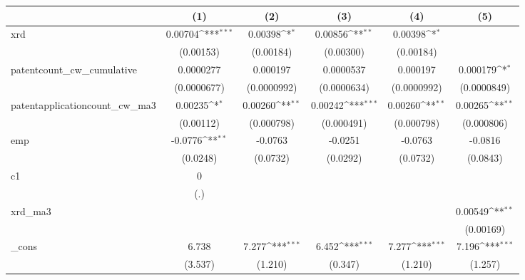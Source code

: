 {
\def\sym#1{\ifmmode^{#1}\else\(^{#1}\)\fi}
\begin{tabular}{l*{5}{c}}
\hline\hline
            &\multicolumn{1}{c}{(1)}         &\multicolumn{1}{c}{(2)}         &\multicolumn{1}{c}{(3)}         &\multicolumn{1}{c}{(4)}         &\multicolumn{1}{c}{(5)}         \\
\hline
xrd         &     0.00704\sym{***}&     0.00398\sym{*}  &     0.00856\sym{**} &     0.00398\sym{*}  &                     \\
            &   (0.00153)         &   (0.00184)         &   (0.00300)         &   (0.00184)         &                     \\
[1em]
patentcount\_cw\_cumulative&   0.0000277         &    0.000197         &   0.0000537         &    0.000197         &    0.000179\sym{*}  \\
            & (0.0000677)         & (0.0000992)         & (0.0000634)         & (0.0000992)         & (0.0000849)         \\
[1em]
patentapplicationcount\_cw\_ma3&     0.00235\sym{*}  &     0.00260\sym{**} &     0.00242\sym{***}&     0.00260\sym{**} &     0.00265\sym{**} \\
            &   (0.00112)         &  (0.000798)         &  (0.000491)         &  (0.000798)         &  (0.000806)         \\
[1em]
emp         &     -0.0776\sym{**} &     -0.0763         &     -0.0251         &     -0.0763         &     -0.0816         \\
            &    (0.0248)         &    (0.0732)         &    (0.0292)         &    (0.0732)         &    (0.0843)         \\
[1em]
c1          &           0         &                     &                     &                     &                     \\
            &         (.)         &                     &                     &                     &                     \\
[1em]
xrd\_ma3     &                     &                     &                     &                     &     0.00549\sym{**} \\
            &                     &                     &                     &                     &   (0.00169)         \\
[1em]
\_cons      &       6.738         &       7.277\sym{***}&       6.452\sym{***}&       7.277\sym{***}&       7.196\sym{***}\\
            &     (3.537)         &     (1.210)         &     (0.347)         &     (1.210)         &     (1.257)         \\

\end{tabular}}
